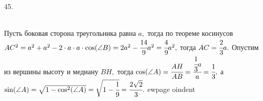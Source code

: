 45. \begin{figure}[ht!]
\end{figure}\\
Пусть боковая сторона треугольника равна $a,$ тогда по теореме косинусов $AC^2=a^2+a^2-2\cdot a\cdot a\cdot \cos(\angle B)=2a^2-\cfrac{14}{9}a^2=\cfrac{4}{9}a^2,$
тогда $AC=\cfrac{2}{3}a.$ Опустим из вершины высоту и медиану $BH,$ тогда $\cos(\angle A)=\cfrac{AH}{AB}=\cfrac{\cfrac{1}{3}a}{a}=\cfrac{1}{3},$
а $\sin(\angle A)=\sqrt{1-\cos^2(\angle A)}=\sqrt{1-\cfrac{1}{9}}=\cfrac{2\sqrt{2}}{3}.$
ewpage
oindent
